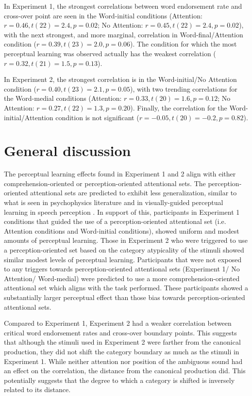 In Experiment 1, the strongest correlations between word endorsement rate and cross-over point are seen in the Word-initial conditions (Attention: $r = 0.46, t(22) = 2.4, p = 0.02$; No Attention: $r = 0.45, t(22) = 2.4, p = 0.02$), with the next strongest, and more marginal, correlation in Word-final/Attention condition ($r = 0.39, t(23) = 2.0, p = 0.06$).  The condition for which the most perceptual learning was observed actually has the weakest correlation ($r = 0.32, t(21) = 1.5, p = 0.13$).

In Experiment 2, the strongest correlation is in the Word-initial/No Attention condition ($r = 0.40, t(23) = 2.1, p = 0.05$), with two trending correlations for the Word-medial conditions (Attention: $r = 0.33, t(20) = 1.6, p = 0.12$; No Attention: $r = 0.27, t(22) = 1.3, p = 0.20$).  Finally, the correlation for the Word-initial/Attention condition is not significant ($r = -0.05, t(20) = -0.2, p = 0.82$).

\section{General discussion}


The perceptual learning effects found in Experiment 1 and 2 align with either comprehension-oriented or perception-oriented attentional sets.  
The perception-oriented attentional sets are predicted to exhibit less generalization, similar to what is seen in psychophysics literature and  in visually-guided perceptual learning in speech perception \citep{Reinisch2014}.
In support of this, participants in Experiment 1 conditions that guided the use of a perception-oriented attentional set (i.e. Attention conditions and Word-initial conditions), showed uniform and modest amounts of perceptual learning.
Those in Experiment 2 who were triggered to use a perception-oriented set based on the category atypicality of the stimuli showed similar modest levels of perceptual learning.
Participants that were not exposed to any triggers towards perception-oriented attentional sets (Experiment 1/ No Attention/ Word-medial) were predicted to use a more comprehension-oriented attentional set which aligns with the task performed.
These participants showed a substantially larger perceptual effect than those bias towards perception-oriented attentional sets.

Compared to Experiment 1, Experiment 2 had a weaker correlation between critical word endorsement rates and cross-over boundary points.
This suggests that although the stimuli used in Experiment 2 were farther from the canonical production, they did not shift the category boundary as much as the stimuli in Experiment 1.  
While neither attention nor position of the ambiguous sound had an effect on the correlation, the distance from the canonical production did.  
This potentially suggests that the degree to which a category is shifted is inversely related to its distance.

